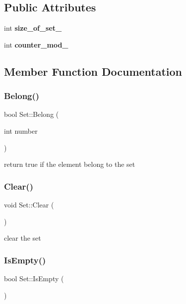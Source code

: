 \subsection*{Public Attributes}
\begin{DoxyCompactItemize}
\item 
\mbox{\label{classSet_a22a8ef647115a534ffba7bac30e44676}} 
int {\bfseries size\+\_\+of\+\_\+set\+\_\+}
\item 
\mbox{\label{classSet_a9c6f21f89012e343006db3672289728d}} 
int {\bfseries counter\+\_\+mod\+\_\+}
\end{DoxyCompactItemize}


\subsection{Member Function Documentation}
\mbox{\label{classSet_a8fb9899afe9a09628706cf539cc75a1c}} 
\subsubsection{\texorpdfstring{Belong()}{Belong()}}
{\footnotesize\ttfamily bool Set\+::\+Belong (\begin{DoxyParamCaption}\item[{int}]{number }\end{DoxyParamCaption})}

return true if the element belong to the set \mbox{\label{classSet_abe5c5439f3665baba2da0b1f1a4c03fd}} 
\subsubsection{\texorpdfstring{Clear()}{Clear()}}
{\footnotesize\ttfamily void Set\+::\+Clear (\begin{DoxyParamCaption}{ }\end{DoxyParamCaption})}

clear the set \mbox{\label{classSet_a0361a3a2b7a408514a259b326245cbc7}} 
\subsubsection{\texorpdfstring{Is\+Empty()}{IsEmpty()}}
{\footnotesize\ttfamily bool Set\+::\+Is\+Empty (\begin{DoxyParamCaption}{ }\end{DoxyParamCaption})}


